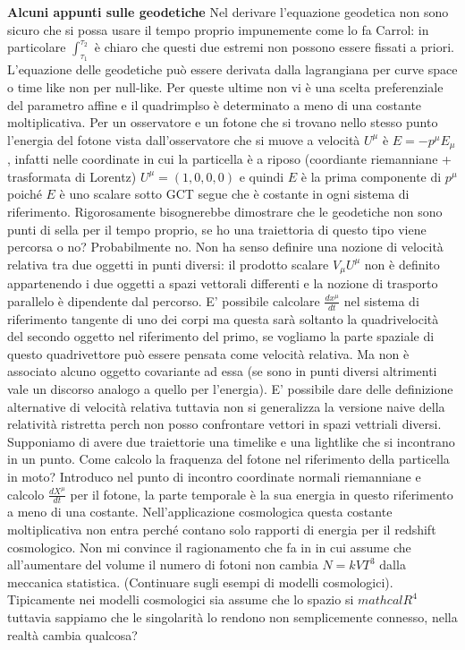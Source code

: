 \documentclass[10pt,a4paper]{article}
\begin{document}
\textbf{Alcuni appunti sulle geodetiche}
Nel derivare l'equazione geodetica non sono sicuro che si possa usare il tempo proprio impunemente come lo fa Carrol: in particolare $\int_{\tau_1}^{\tau_2}$ è chiaro che questi due estremi non possono essere fissati a priori. L'equazione delle geodetiche può essere derivata dalla lagrangiana per curve space o time like non per null-like. Per queste ultime non vi è una scelta preferenziale del parametro affine e il quadrimplso è determinato a meno di una costante moltiplicativa.
Per un osservatore e un fotone che si trovano nello stesso punto l'energia del fotone vista dall'osservatore che si muove a velocità $U^{\mu}$ è $E = -p^{\mu}E_{\mu}$, infatti nelle coordinate in cui la particella è a riposo (coordiante riemanniane + trasformata di Lorentz) $U^{\mu} = (1, 0, 0, 0)$ e quindi $E$ è la prima componente di $p^{\mu}$ poiché $E$ è uno scalare sotto GCT segue che è costante in ogni sistema di riferimento.
Rigorosamente bisognerebbe dimostrare che le geodetiche non sono punti di sella per il tempo proprio, se ho una traiettoria di questo tipo viene percorsa o no? Probabilmente no.
Non ha senso definire una nozione di velocità relativa tra due oggetti in punti diversi: il prodotto scalare $V_{\mu}U^{\mu}$ non è definito appartenendo i due oggetti a spazi vettorali differenti e la nozione di trasporto parallelo è dipendente dal percorso. E' possibile calcolare $\frac{dx^{\mu}}{dt}$ nel sistema di riferimento tangente di uno dei corpi ma questa sarà soltanto la quadrivelocità del secondo oggetto nel riferimento del primo, se vogliamo la parte spaziale di questo quadrivettore può essere pensata come velocità relativa. Ma non è associato alcuno oggetto covariante ad essa (se sono in punti diversi altrimenti vale un discorso analogo a quello per l'energia). E' possibile dare delle definizione alternative di velocità relativa tuttavia non si generalizza la versione naive della relatività ristretta perch non posso confrontare vettori in spazi vettriali diversi.
Supponiamo di avere due traiettorie una timelike e una lightlike che si incontrano in un punto. Come calcolo la fraquenza del fotone nel riferimento della particella in moto? Introduco nel punto di incontro coordinate normali riemanniane e calcolo $\frac{dX^{\mu}}{dt}$ per il fotone, la parte temporale è la sua energia in questo riferimento a meno di una costante. Nell'applicazione cosmologica questa costante moltiplicativa non entra perché contano solo rapporti di energia per il redshift cosmologico. Non mi convince il ragionamento che fa in in cui assume che all'aumentare del volume il numero di fotoni non cambia $N = k V T^3$ dalla meccanica statistica. (Continuare sugli esempi di modelli cosmologici). Tipicamente nei modelli cosmologici sia assume che lo spazio si $mathcal{R}^4$ tuttavia sappiamo che le singolarità lo rendono non semplicemente connesso, nella realtà cambia qualcosa?
\end{document}
